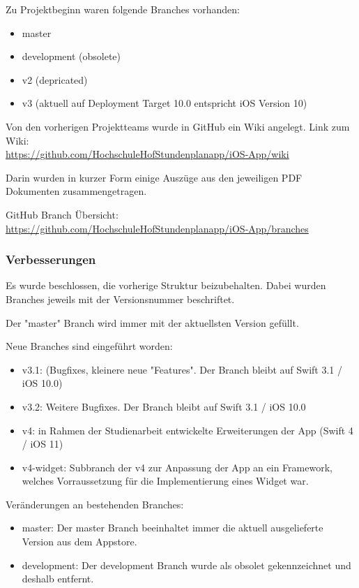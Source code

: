 Zu Projektbeginn waren folgende Branches vorhanden:
\begin{itemize}
\item master
\item development (obsolete)
\item v2 (depricated)
\item v3 (aktuell auf Deployment Target 10.0 entspricht iOS Version 10)
\end{itemize}


Von den vorherigen Projektteams wurde in GitHub ein Wiki angelegt.
Link zum Wiki:\\
\url{https://github.com/HochschuleHofStundenplanapp/iOS-App/wiki}

Darin wurden in kurzer Form einige Auszüge aus den jeweiligen PDF Dokumenten zusammengetragen.




GitHub Branch Übersicht:\\
 \url{https://github.com/HochschuleHofStundenplanapp/iOS-App/branches}

\subsubsection{Verbesserungen}
Es wurde beschlossen, die vorherige Struktur beizubehalten. Dabei wurden Branches jeweils mit der Versionsnummer beschriftet.

Der "master" Branch wird immer mit der aktuellsten Version gefüllt.

Neue Branches sind eingeführt worden:
\begin{itemize}
\item v3.1: (Bugfixes, kleinere neue "Features". Der Branch bleibt auf Swift 3.1  / iOS 10.0)
\item v3.2: Weitere Bugfixes. Der Branch bleibt auf Swift 3.1  / iOS 10.0 %
\item v4: in Rahmen der Studienarbeit entwickelte Erweiterungen der App (Swift 4 / iOS 11)
\item v4-widget: Subbranch der v4 zur Anpassung der App an ein Framework, welches
Vorraussetzung für die Implementierung eines Widget war.
\end{itemize}
\newpage
Veränderungen an bestehenden Branches:
\begin{itemize}
\item master: Der master Branch beeinhaltet immer die aktuell ausgelieferte Version aus dem Appstore.
\item development: Der development Branch wurde als obsolet gekennzeichnet und deshalb entfernt.
\end{itemize}


